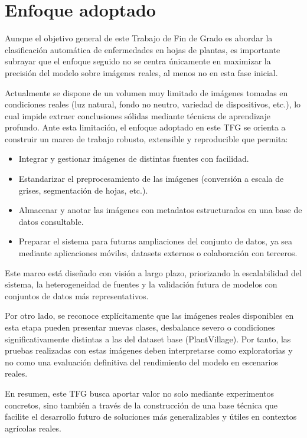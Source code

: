 \documentclass[12pt,a4paper]{article}
\begin{document}
\section*{Enfoque adoptado}

Aunque el objetivo general de este Trabajo de Fin de Grado es abordar la clasificación automática de enfermedades en hojas de plantas, es importante subrayar que el enfoque seguido no se centra únicamente en maximizar la precisión del modelo sobre imágenes reales, al menos no en esta fase inicial.

Actualmente se dispone de un volumen muy limitado de imágenes tomadas en condiciones reales (luz natural, fondo no neutro, variedad de dispositivos, etc.), lo cual impide extraer conclusiones sólidas mediante técnicas de aprendizaje profundo. Ante esta limitación, el enfoque adoptado en este TFG se orienta a construir un marco de trabajo robusto, extensible y reproducible que permita:

\begin{itemize}
  \item Integrar y gestionar imágenes de distintas fuentes con facilidad.
  \item Estandarizar el preprocesamiento de las imágenes (conversión a escala de grises, segmentación de hojas, etc.).
  \item Almacenar y anotar las imágenes con metadatos estructurados en una base de datos consultable.
  \item Preparar el sistema para futuras ampliaciones del conjunto de datos, ya sea mediante aplicaciones móviles, datasets externos o colaboración con terceros.
\end{itemize}

Este marco está diseñado con visión a largo plazo, priorizando la escalabilidad del sistema, la heterogeneidad de fuentes y la validación futura de modelos con conjuntos de datos más representativos.

Por otro lado, se reconoce explícitamente que las imágenes reales disponibles en esta etapa pueden presentar nuevas clases, desbalance severo o condiciones significativamente distintas a las del dataset base (PlantVillage). Por tanto, las pruebas realizadas con estas imágenes deben interpretarse como exploratorias y no como una evaluación definitiva del rendimiento del modelo en escenarios reales.

En resumen, este TFG busca aportar valor no solo mediante experimentos concretos, sino también a través de la construcción de una base técnica que facilite el desarrollo futuro de soluciones más generalizables y útiles en contextos agrícolas reales.
\end{document}

